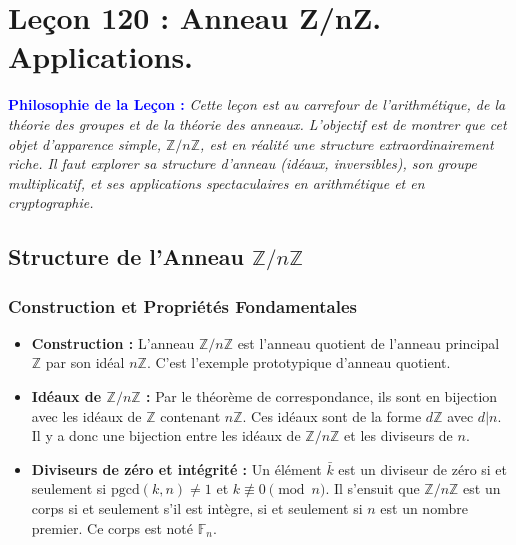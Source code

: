 \documentclass[12pt, a4paper, parskip=full]{report}
\theoremstyle{agregstyle}
\newenvironment{philosophie}
  {\par\medskip\noindent\begin{oframed}\noindent\textbf{\textcolor{blue}{Philosophie de la Leçon :}}\itshape}
  {\end{oframed}\par\medskip}
\begin{document}
\chapter{Leçon 120 : Anneau Z/nZ. Applications.}

\begin{philosophie}
    Cette leçon est au carrefour de l'arithmétique, de la théorie des groupes et de la théorie des anneaux. L'objectif est de montrer que cet objet d'apparence simple, $\mathbb{Z}/n\mathbb{Z}$, est en réalité une structure extraordinairement riche. Il faut explorer sa structure d'anneau (idéaux, inversibles), son groupe multiplicatif, et ses applications spectaculaires en arithmétique et en cryptographie.
\end{philosophie}

\section{Structure de l'Anneau $\mathbb{Z}/n\mathbb{Z}$}

\subsection{Construction et Propriétés Fondamentales}
\begin{itemize}
    \item \textbf{Construction :} L'anneau $\mathbb{Z}/n\mathbb{Z}$ est l'anneau quotient de l'anneau principal $\mathbb{Z}$ par son idéal $n\mathbb{Z}$. C'est l'exemple prototypique d'anneau quotient.
    \item \textbf{Idéaux de $\mathbb{Z}/n\mathbb{Z}$ :} Par le théorème de correspondance, ils sont en bijection avec les idéaux de $\mathbb{Z}$ contenant $n\mathbb{Z}$. Ces idéaux sont de la forme $d\mathbb{Z}$ avec $d|n$. Il y a donc une bijection entre les idéaux de $\mathbb{Z}/n\mathbb{Z}$ et les diviseurs de $n$.
    \item \textbf{Diviseurs de zéro et intégrité :} Un élément $\bar{k}$ est un diviseur de zéro si et seulement si $\mathrm{pgcd}(k,n) \neq 1$ et $k \not\equiv 0 \pmod n$. Il s'ensuit que $\mathbb{Z}/n\mathbb{Z}$ est un corps si et seulement s'il est intègre, si et seulement si $n$ est un nombre premier. Ce corps est noté $\mathbb{F}_n$.
\end{itemize}
\end{document}
